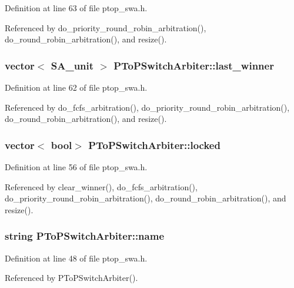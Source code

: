 Definition at line 63 of file ptop\_\-swa.h.

Referenced by do\_\-priority\_\-round\_\-robin\_\-arbitration(), do\_\-round\_\-robin\_\-arbitration(), and resize().
\subsubsection[{last\_\-winner}]{\setlength{\rightskip}{0pt plus 5cm}vector$<$ {\bf SA\_\-unit} $>$ {\bf PToPSwitchArbiter::last\_\-winner}\hspace{0.3cm}{\tt  [private]}}\label{classPToPSwitchArbiter_5947d4082d52451d2e9838981dfc559d}




Definition at line 62 of file ptop\_\-swa.h.

Referenced by do\_\-fcfs\_\-arbitration(), do\_\-priority\_\-round\_\-robin\_\-arbitration(), do\_\-round\_\-robin\_\-arbitration(), and resize().
\subsubsection[{locked}]{\setlength{\rightskip}{0pt plus 5cm}vector$<$ bool$>$ {\bf PToPSwitchArbiter::locked}\hspace{0.3cm}{\tt  [private]}}\label{classPToPSwitchArbiter_657970aaa9fab00ca0bb7d9e4ea80415}




Definition at line 56 of file ptop\_\-swa.h.

Referenced by clear\_\-winner(), do\_\-fcfs\_\-arbitration(), do\_\-priority\_\-round\_\-robin\_\-arbitration(), do\_\-round\_\-robin\_\-arbitration(), and resize().
\subsubsection[{name}]{\setlength{\rightskip}{0pt plus 5cm}string {\bf PToPSwitchArbiter::name}}\label{classPToPSwitchArbiter_5b08d50980b7bde1801d19a57a223d00}




Definition at line 48 of file ptop\_\-swa.h.

Referenced by PToPSwitchArbiter().
